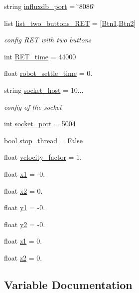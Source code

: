 \begin{DoxyCompactItemize}
string \hyperlink{a00025_a91cab5b28cd6867b74e2cb9f887b2948}{influxdb\+\_\+port} = \char`\"{}8086\char`\"{}
\item 
list \hyperlink{a00025_aceb7d96541943b4a77c54516a2be88d2}{list\+\_\+two\+\_\+buttons\+\_\+\+R\+ET} = \mbox{[}\hyperlink{a00025_af037c6b9ff0314103d8127acc9d07e0b}{Btn1},\hyperlink{a00025_a73afa8c52cebd94e1889df5fbe3bec66}{Btn2}\mbox{]}
\begin{DoxyCompactList}\small\item\em config R\+ET with two buttons \end{DoxyCompactList}\item 
int \hyperlink{a00025_a262169df063120aeead2e82d4cdb440c}{R\+E\+T\+\_\+time} = 44000
\item 
float \hyperlink{a00025_aff247d8ee094bb439dbb098e236455cb}{robot\+\_\+settle\+\_\+time} = 0.
\item 
string \hyperlink{a00025_a2014ea8569b3cda02e44e85f8840eba2}{socket\+\_\+host} = \textquotesingle{}10...\textquotesingle{}
\begin{DoxyCompactList}\small\item\em config of the socket \end{DoxyCompactList}\item 
int \hyperlink{a00025_a08c4648fe1aa34a4fd5ad0097d17237f}{socket\+\_\+port} = 5004
\item 
bool \hyperlink{a00025_a94d742b756b055a53df310fd15705ede}{stop\+\_\+thread} = False
\item 
float \hyperlink{a00025_a0fee7ae942bb4b6078c6400331aef6f1}{velocity\+\_\+factor} = 1.
\item 
float \hyperlink{a00025_a3389d8b95846602e8f94cc15f41e48e9}{x1} = -\/0.
\item 
float \hyperlink{a00025_a24d6ffb6e8780eef0c81cd97e3f4fdaf}{x2} = 0.
\item 
float \hyperlink{a00025_a9fe80bf4738047a31d7c162807ed85f0}{y1} = -\/0.
\item 
float \hyperlink{a00025_a07bcd014e69eddcf4243b2a961014eaf}{y2} = -\/0.
\item 
float \hyperlink{a00025_a7da4886c0a2e03b8bb9ed62eb20efb78}{z1} = 0.
\item 
float \hyperlink{a00025_a55196b87940893e540ba636218f4eb07}{z2} = 0.
\end{DoxyCompactItemize}


\subsection{Variable Documentation}
\mbox{\label{a00025_ac77790b4dfdf11c2ae7b5b9505ff0bd3}} 
